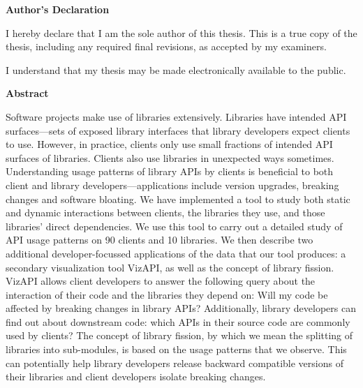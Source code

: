 \cleardoublepage %

\begin{center}\textbf{Author's Declaration}\end{center}
  \noindent
I hereby declare that I am the sole author of this thesis. This is a true copy of the thesis, including any required final revisions, as accepted by my examiners.

  \bigskip
  
  \noindent
I understand that my thesis may be made electronically available to the public.

\cleardoublepage


\begin{center}\textbf{Abstract}\end{center}

Software projects make use of libraries extensively. Libraries have intended API surfaces—sets of exposed library interfaces that library developers expect clients to use. However, in practice, clients only use small fractions of intended API surfaces of libraries. Clients also use libraries in unexpected ways sometimes. Understanding usage patterns of library APIs by clients is beneficial to both client and library developers—applications include version upgrades, breaking changes and software bloating. We have implemented a tool to study both static and dynamic interactions between clients, the libraries they use, and those libraries’ direct dependencies. We use this tool to carry out a detailed study of API usage patterns on 90 clients and 10 libraries. We then describe two additional developer-focussed applications of the data that our tool produces: a secondary visualization tool VizAPI, as well as the concept of library fission. VizAPI allows client developers to answer the following query about the interaction of their code and the libraries they depend on: Will my code be affected by breaking changes in library APIs? Additionally, library developers can find out about downstream code: which APIs in their source code are commonly used by clients? The concept of library fission, by which we mean the splitting of libraries into sub-modules, is based on the usage patterns that we observe. This can potentially help library developers release backward compatible versions of their libraries and client developers isolate breaking changes. 

